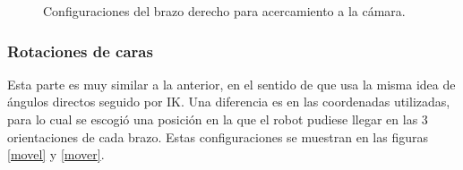 \begin{figure}[h!]
	\centering
	\hfill
	\hfill
	\caption{Configuraciones del brazo derecho para acercamiento a la cámara.}
	\label{camr}
\end{figure}

\subsubsection{Rotaciones de caras}
Esta parte es muy similar a la anterior, en el sentido de que usa la misma idea de ángulos directos seguido por IK. Una diferencia es en las coordenadas utilizadas, para lo cual se escogió una posición en la que el robot pudiese llegar en las 3 orientaciones de cada brazo. Estas configuraciones se muestran en las figuras \ref{movel} y \ref{mover}.

